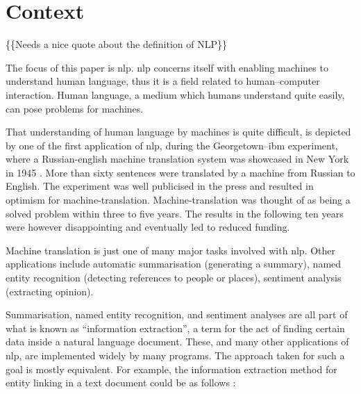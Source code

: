 \chapter{Context}\label{context}

\{\{Needs a nice quote about the definition of NLP\}\}

The focus of this paper is \gls{nlp}. \Gls{nlp} concerns itself with
enabling machines to understand human language, thus it is a field
related to human--computer interaction. Human language, a medium which
humans understand quite easily, can pose problems for machines.

That understanding of human language by machines is quite difficult, is
depicted by one of the first application of \gls{nlp}, during the
Georgetown--\acrshort{ibm} experiment, where a Russian-english machine
translation system was showcased in New York in 1945
\autocite{hutchins-john-georgetown-ibm-system}. More than sixty
sentences were translated by a machine from Russian to English. The
experiment was well publicised in the press and resulted in optimism for
machine-translation. Machine-translation was thought of as being a
solved problem within three to five years. The results in the following
ten years were however disappointing and eventually led to reduced
funding.

Machine translation is just one of many major tasks involved with
\gls{nlp}. Other applications include automatic summarisation
(generating a summary), named entity recognition (detecting references
to people or places), sentiment analysis (extracting opinion).

Summarisation, named entity recognition, and sentiment analyses are all
part of what is known as ``information extraction'', a term for the act
of finding certain data inside a natural language document. These, and
many other applications of \gls{nlp}, are implemented widely by many
programs. The approach taken for such a goal is mostly equivalent. For
example, the information extraction method for entity linking in a text
document could be as follows \autocite[according
to][]{stanbol-enhancer-nlp}:


